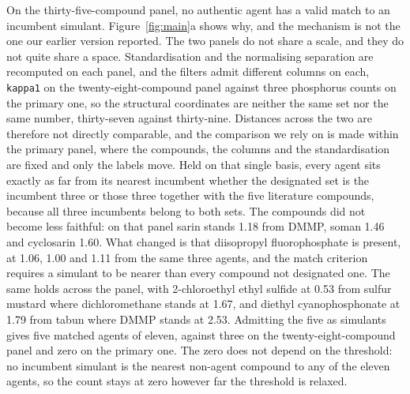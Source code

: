 \documentclass[1p,times]{elsarticle}
\begin{document}
On the thirty-five-compound panel, no authentic agent has a valid match to an
incumbent simulant. Figure~\ref{fig:main}a shows why, and the mechanism is not
the one our earlier version reported. The two panels do not share a scale, and
they do not quite share a space. Standardisation and the normalising separation
are recomputed on each panel, and the filters admit different columns on
each, \texttt{kappa1} on the twenty-eight-compound panel against three
phosphorus counts on the primary one, so the structural coordinates are neither
the same set nor the same number, thirty-seven against thirty-nine.
Distances across the two are therefore not directly comparable, and the
comparison we rely on is made within the primary panel, where the compounds,
the columns and the standardisation are fixed and only the labels move. Held on
that single basis, every agent sits exactly as far from its nearest incumbent
whether the designated set is the incumbent three or those three together with
the five literature compounds, because all three incumbents belong to both
sets. The compounds did not become less faithful: on that panel sarin stands
1.18 from DMMP, soman 1.46 and cyclosarin 1.60. What changed is that diisopropyl
fluorophosphate is present, at 1.06, 1.00 and 1.11 from the same three agents,
and the match criterion requires a simulant to be nearer than every compound not
designated one. The same holds across the panel, with 2-chloroethyl ethyl
sulfide at 0.53 from sulfur mustard where dichloromethane stands at 1.67, and
diethyl cyanophosphonate at 1.79 from tabun where DMMP stands at 2.53.
Admitting the five as simulants gives five matched agents of eleven, against
three on the twenty-eight-compound panel and zero on the primary one. The zero
does not depend on the threshold: no incumbent simulant is the
nearest non-agent compound to any of the eleven agents, so the count stays at
zero however far the threshold is relaxed.
\end{document}
